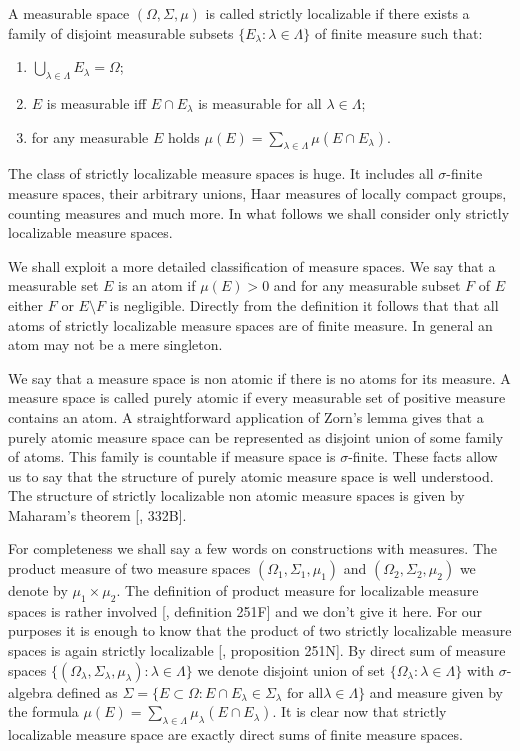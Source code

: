 A measurable space $(\Omega,\Sigma,\mu)$ is called strictly localizable if there
exists a  family of disjoint measurable subsets 
$ \{E_\lambda:\lambda\in\Lambda \}$ of finite measure such that: 
\begin{enumerate}[label = (\roman*)]
  \item $\bigcup_{\lambda\in\Lambda}E_\lambda=\Omega$;

  \item $E$ is measurable iff $E\cap E_\lambda$ is measurable for all
  $\lambda\in\Lambda$;

  \item for any measurable $E$ holds 
  $\mu(E)=\sum_{\lambda\in\Lambda}\mu(E\cap E_\lambda)$. 
\end{enumerate}
  
The class of strictly localizable measure spaces is huge. It includes all
$\sigma$-finite measure spaces, their arbitrary unions, Haar measures of
locally compact groups, counting measures and much more. In what follows we
shall consider only strictly localizable measure spaces.

We shall exploit a more detailed classification of measure spaces. We say that a
measurable set $E$ is an atom if $\mu(E)>0$ and for any measurable subset $F$ of
$E$ either $F$ or $E\setminus F$ is negligible. Directly from the definition it
follows that that all atoms of strictly localizable measure spaces are of finite
measure. In general an atom may not be a mere singleton.

We say that a measure space is non atomic if there is no atoms for its measure.
A measure space is called purely atomic if every measurable set of positive
measure contains an atom. A straightforward application of Zorn's lemma gives
that a purely atomic measure space can be represented as disjoint union of some
family of atoms. This family is countable if measure space is $\sigma$-finite.
These facts allow us to say that the structure of purely atomic measure space is
well understood. The structure of strictly localizable non atomic measure spaces
is given by Maharam's theorem [\cite{FremMeasTh}, 332B]. 

For completeness we shall say a few words on constructions with measures. The
product measure of two measure spaces $(\Omega_1,\Sigma_1,\mu_1)$ and
$(\Omega_2,\Sigma_2,\mu_2)$ we denote by $\mu_1\times \mu_2$. The definition of
product measure for localizable measure spaces is rather involved
[\cite{FremMeasTh}, definition 251F] and we don't give it here.  For our
purposes it is enough to know that the product of two strictly localizable
measure spaces is again strictly localizable [\cite{FremMeasTh}, proposition
251N]. By direct sum of measure spaces $ \{(\Omega_\lambda, \Sigma_\lambda,
\mu_\lambda):\lambda\in\Lambda \}$ we denote disjoint union of set $
\{\Omega_\lambda:\lambda\in\Lambda \}$ with $\sigma$-algebra defined as 
$\Sigma= \{
  E\subset \Omega: E\cap E_\lambda\in\Sigma_\lambda
  \mbox{ for all}\lambda\in\Lambda
 \}$ 
and measure given by the formula 
$\mu(E)=\sum_{\lambda\in\Lambda}\mu_\lambda(E\cap E_\lambda)$. It is clear now
that strictly localizable measure space are exactly direct sums of finite
measure spaces.


